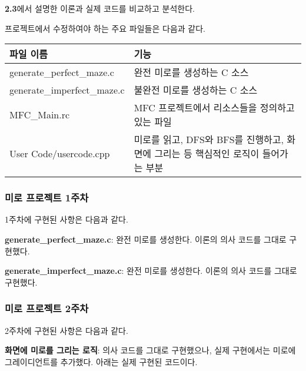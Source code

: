 \textbf{2.3}에서 설명한 이론과 실제 코드를 비교하고 분석한다.

프로젝트에서 수정하여야 하는 주요 파일들은 다음과 같다. 

\begin{tabularx}{\linewidth}{l|X}
    파일 이름 & 기능 \\
    \hline
    generate_perfect_maze.c & 완전 미로를 생성하는 C 소스 \\
    generate_imperfect_maze.c & 불완전 미로를 생성하는 C 소스 \\
    \hline
    MFC_Main.rc & MFC 프로젝트에서 리소스들을 정의하고 있는 파일 \\
    User Code/usercode.cpp & 미로를 읽고, DFS와 BFS를 진행하고, 화면에 그리는 등 핵심적인 로직이 들어가는 부분 \\
\end{tabularx}

\subsubsection{미로 프로젝트 1주차} 1주차에 구현된 사항은 다음과 같다.

\textbf{generate_perfect_maze.c}: 완전 미로를 생성한다. 이론의 의사 코드를 그대로 구현했다.

\textbf{generate_imperfect_maze.c}: 완전 미로를 생성한다. 이론의 의사 코드를 그대로 구현했다.

\subsubsection{미로 프로젝트 2주차} 2주차에 구현된 사항은 다음과 같다.

\textbf{화면에 미로를 그리는 로직}: 의사 코드를 그대로 구현했으나, 실제 구현에서는 미로에 그레이디언트를 추가했다. 아래는 실제 구현된 코드이다.

